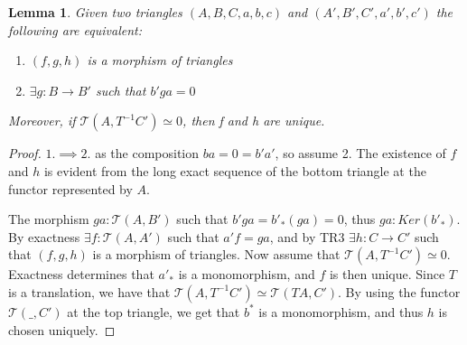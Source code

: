 \documentclass[12pt]{article}
\newtheorem{lemma}[theorem]{Lemma}
\theoremstyle{definition}
\theoremstyle{remark}
\begin{document}
            \begin{lemma}
                Given two triangles $(A,B,C,a,b,c)$ and $(A',B',C',a',b',c')$ the following are equivalent:
                \begin{center}
                    \begin{minipage}[c]{0.4\textwidth}
                    \end{minipage}
                    \begin{minipage}[c]{0.5\textwidth}
                        \begin{enumerate}
                            \item $(f,g,h)$ is a morphism of triangles
                            \item $\exists g:B\rightarrow B'$ such that $b'ga = 0$
                        \end{enumerate}
                    \end{minipage}
                \end{center}
                Moreover, if $\mathcal{T}(A,T^{-1}C')\simeq 0$, then f and h are unique.
            \end{lemma}

            \begin{proof}
                $1. \implies 2.$ as the composition $ba = 0 = b'a'$, so assume 2. The existence of $f$ and $h$ is evident from the long exact sequence of the bottom triangle at the functor represented by $A$. 
                \begin{center}
                \end{center}
                The morphism $ga:\mathcal{T}(A,B')$ such that $b'ga=b'_*(ga)=0$, thus $ga:Ker(b'_*)$. By exactness $\exists f:\mathcal{T}(A,A')$ such that $a'f = ga$, and by TR3 $\exists h: C \rightarrow C'$ such that $(f,g,h)$ is a morphism of triangles.
                Now assume that $\mathcal{T}(A,T^{-1}C')\simeq 0$. Exactness determines that $a'_*$ is a monomorphism, and $f$ is then unique. Since $T$ is a translation, we have that $\mathcal{T}(A,T^{-1}C')\simeq\mathcal{T}(TA,C')$. By using the functor $\mathcal{T}(\_,C')$ at the top triangle, we get that $b^*$ is a monomorphism, and thus $h$ is chosen uniquely.
            \end{proof}
\end{document}

